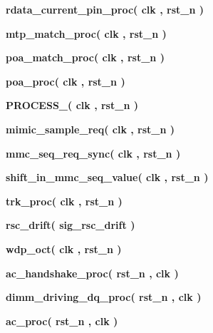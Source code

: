 \begin{DoxyCompactItemize}
\item 
{\bf rdata\+\_\+current\+\_\+pin\+\_\+proc}{\bfseries  ( {\bfseries {\bfseries {\bf clk}} \textcolor{vhdlchar}{ }} , {\bfseries {\bfseries {\bf rst\+\_\+n}} \textcolor{vhdlchar}{ }} )}
\item 
{\bf mtp\+\_\+match\+\_\+proc}{\bfseries  ( {\bfseries {\bfseries {\bf clk}} \textcolor{vhdlchar}{ }} , {\bfseries {\bfseries {\bf rst\+\_\+n}} \textcolor{vhdlchar}{ }} )}
\item 
{\bf poa\+\_\+match\+\_\+proc}{\bfseries  ( {\bfseries {\bfseries {\bf clk}} \textcolor{vhdlchar}{ }} , {\bfseries {\bfseries {\bf rst\+\_\+n}} \textcolor{vhdlchar}{ }} )}
\item 
{\bf poa\+\_\+proc}{\bfseries  ( {\bfseries {\bfseries {\bf clk}} \textcolor{vhdlchar}{ }} , {\bfseries {\bfseries {\bf rst\+\_\+n}} \textcolor{vhdlchar}{ }} )}
\item 
{\bf P\+R\+O\+C\+E\+S\+S\+\_}{\bfseries  ( {\bfseries {\bfseries {\bf clk}} \textcolor{vhdlchar}{ }} , {\bfseries {\bfseries {\bf rst\+\_\+n}} \textcolor{vhdlchar}{ }} )}
\item 
{\bf mimic\+\_\+sample\+\_\+req}{\bfseries  ( {\bfseries {\bfseries {\bf clk}} \textcolor{vhdlchar}{ }} , {\bfseries {\bfseries {\bf rst\+\_\+n}} \textcolor{vhdlchar}{ }} )}
\item 
{\bf mmc\+\_\+seq\+\_\+req\+\_\+sync}{\bfseries  ( {\bfseries {\bfseries {\bf clk}} \textcolor{vhdlchar}{ }} , {\bfseries {\bfseries {\bf rst\+\_\+n}} \textcolor{vhdlchar}{ }} )}
\item 
{\bf shift\+\_\+in\+\_\+mmc\+\_\+seq\+\_\+value}{\bfseries  ( {\bfseries {\bfseries {\bf clk}} \textcolor{vhdlchar}{ }} , {\bfseries {\bfseries {\bf rst\+\_\+n}} \textcolor{vhdlchar}{ }} )}
\item 
{\bf trk\+\_\+proc}{\bfseries  ( {\bfseries {\bfseries {\bf clk}} \textcolor{vhdlchar}{ }} , {\bfseries {\bfseries {\bf rst\+\_\+n}} \textcolor{vhdlchar}{ }} )}
\item 
{\bf rsc\+\_\+drift}{\bfseries  ( {\bfseries {\bfseries {\bf sig\+\_\+rsc\+\_\+drift}} \textcolor{vhdlchar}{ }} )}
\item 
{\bf wdp\+\_\+oct}{\bfseries  ( {\bfseries {\bfseries {\bf clk}} \textcolor{vhdlchar}{ }} , {\bfseries {\bfseries {\bf rst\+\_\+n}} \textcolor{vhdlchar}{ }} )}
\item 
{\bf ac\+\_\+handshake\+\_\+proc}{\bfseries  ( {\bfseries {\bfseries {\bf rst\+\_\+n}} \textcolor{vhdlchar}{ }} , {\bfseries {\bfseries {\bf clk}} \textcolor{vhdlchar}{ }} )}
\item 
{\bf dimm\+\_\+driving\+\_\+dq\+\_\+proc}{\bfseries  ( {\bfseries {\bfseries {\bf rst\+\_\+n}} \textcolor{vhdlchar}{ }} , {\bfseries {\bfseries {\bf clk}} \textcolor{vhdlchar}{ }} )}
\item 
{\bf ac\+\_\+proc}{\bfseries  ( {\bfseries {\bfseries {\bf rst\+\_\+n}} \textcolor{vhdlchar}{ }} , {\bfseries {\bfseries {\bf clk}} \textcolor{vhdlchar}{ }} )}
\end{DoxyCompactItemize}
